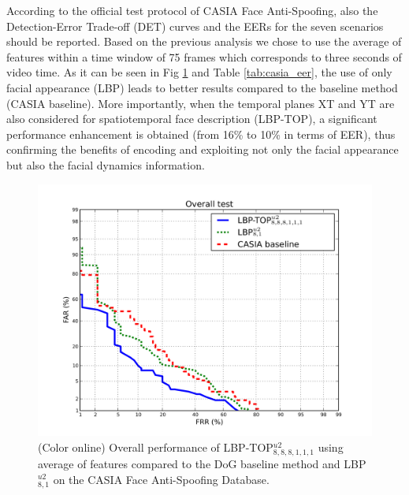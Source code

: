 According to the official test protocol of CASIA Face Anti-Spoofing, also the Detection-Error Trade-off (DET) curves and the EERs for the seven scenarios should be reported. Based on the previous analysis we chose to use the average of features within a time window of 75 frames which corresponds to three seconds of video time. As it can be seen in Fig \ref{fig:DET_overall} and Table \ref{tab:casia_eer}, the use of only facial appearance (LBP) leads to better results compared to the baseline method (CASIA baseline). More importantly, when the temporal planes XT and YT are also considered for spatiotemporal face description (LBP-TOP), a significant performance enhancement is obtained (from 16\% to 10\% in terms of EER), thus confirming the benefits of encoding and exploiting not only the facial appearance but also the facial dynamics information.

\begin{figure}[h]
\begin{center}
\includegraphics [width=0.6\linewidth] {images/proposed_countermeasure/casia_scenarios_XYT_XY_baseline.pdf}
\caption{(Color online) Overall performance of LBP-TOP$_{8,8,8,1,1,1}^{u2}$ using average of features compared to the DoG baseline method and LBP$_{8,1}^{u2}$ on the CASIA Face Anti-Spoofing Database.} 
\label{fig:DET_overall}
\end{center}
\end{figure}


